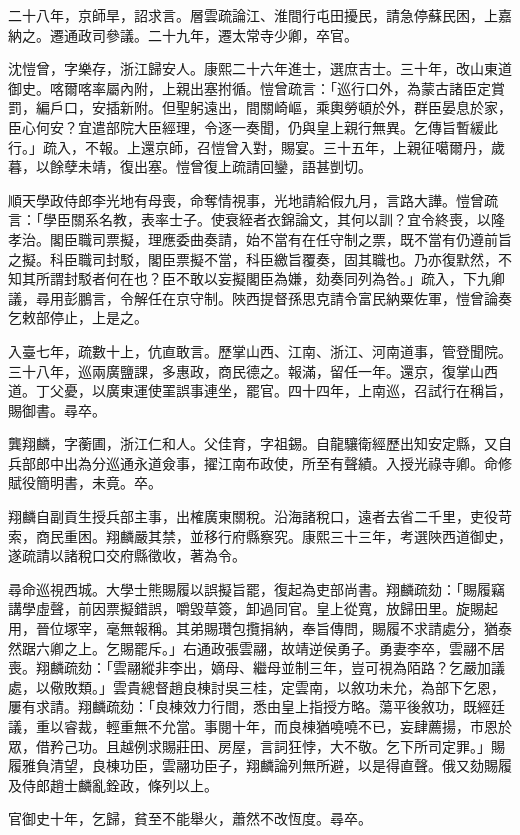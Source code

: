 \begin{pinyinscope}
二十八年，京師旱，詔求言。層雲疏論江、淮間行屯田擾民，請急停蘇民困，上嘉納之。遷通政司參議。二十九年，遷太常寺少卿，卒官。

沈愷曾，字樂存，浙江歸安人。康熙二十六年進士，選庶吉士。三十年，改山東道御史。喀爾喀率屬內附，上親出塞拊循。愷曾疏言：「巡行口外，為蒙古諸臣定賞罰，編戶口，安插新附。但聖躬遠出，間關崎嶇，乘輿勞頓於外，群臣晏息於家，臣心何安？宜遣部院大臣經理，令逐一奏聞，仍與皇上親行無異。乞傳旨暫緩此行。」疏入，不報。上還京師，召愷曾入對，賜宴。三十五年，上親征噶爾丹，歲暮，以餘孽未靖，復出塞。愷曾復上疏請回鑾，語甚剴切。

順天學政侍郎李光地有母喪，命奪情視事，光地請給假九月，言路大譁。愷曾疏言：「學臣關系名教，表率士子。使衰絰者衣錦論文，其何以訓？宜令終喪，以隆孝治。閣臣職司票擬，理應委曲奏請，始不當有在任守制之票，既不當有仍遵前旨之擬。科臣職司封駁，閣臣票擬不當，科臣繳旨覆奏，固其職也。乃亦復默然，不知其所謂封駁者何在也？臣不敢以妄擬閣臣為嫌，劾奏同列為咎。」疏入，下九卿議，尋用彭鵬言，令解任在京守制。陜西提督孫思克請令富民納粟佐軍，愷曾論奏乞敕部停止，上是之。

入臺七年，疏數十上，伉直敢言。歷掌山西、江南、浙江、河南道事，管登聞院。三十八年，巡兩廣鹽課，多惠政，商民德之。報滿，留任一年。還京，復掌山西道。丁父憂，以廣東運使罣誤事連坐，罷官。四十四年，上南巡，召試行在稱旨，賜御書。尋卒。

龔翔麟，字蘅圃，浙江仁和人。父佳育，字祖錫。自龍驤衛經歷出知安定縣，又自兵部郎中出為分巡通永道僉事，擢江南布政使，所至有聲績。入授光祿寺卿。命修賦役簡明書，未竟。卒。

翔麟自副貢生授兵部主事，出榷廣東關稅。沿海諸稅口，遠者去省二千里，吏役苛索，商民重困。翔麟嚴其禁，並移行府縣察究。康熙三十三年，考選陜西道御史，遂疏請以諸稅口交府縣徵收，著為令。

尋命巡視西城。大學士熊賜履以誤擬旨罷，復起為吏部尚書。翔麟疏劾：「賜履竊講學虛聲，前因票擬錯誤，嚼毀草簽，卸過同官。皇上從寬，放歸田里。旋賜起用，晉位塚宰，毫無報稱。其弟賜瓚包攬捐納，奉旨傳問，賜履不求請處分，猶泰然踞六卿之上。乞賜罷斥。」右通政張雲翮，故靖逆侯勇子。勇妻李卒，雲翮不居喪。翔麟疏劾：「雲翮縱非李出，嫡母、繼母並制三年，豈可視為陌路？乞嚴加議處，以儆敗類。」雲貴總督趙良棟討吳三桂，定雲南，以敘功未允，為部下乞恩，屢有求請。翔麟疏劾：「良棟效力行間，悉由皇上指授方略。蕩平後敘功，既經廷議，重以睿裁，輕重無不允當。事閱十年，而良棟猶嘵嘵不已，妄肆薦揚，市恩於眾，借矜己功。且越例求賜莊田、房屋，言詞狂悖，大不敬。乞下所司定罪。」賜履雅負清望，良棟功臣，雲翮功臣子，翔麟論列無所避，以是得直聲。俄又劾賜履及侍郎趙士麟亂銓政，條列以上。

官御史十年，乞歸，貧至不能舉火，蕭然不改恆度。尋卒。


\end{pinyinscope}
